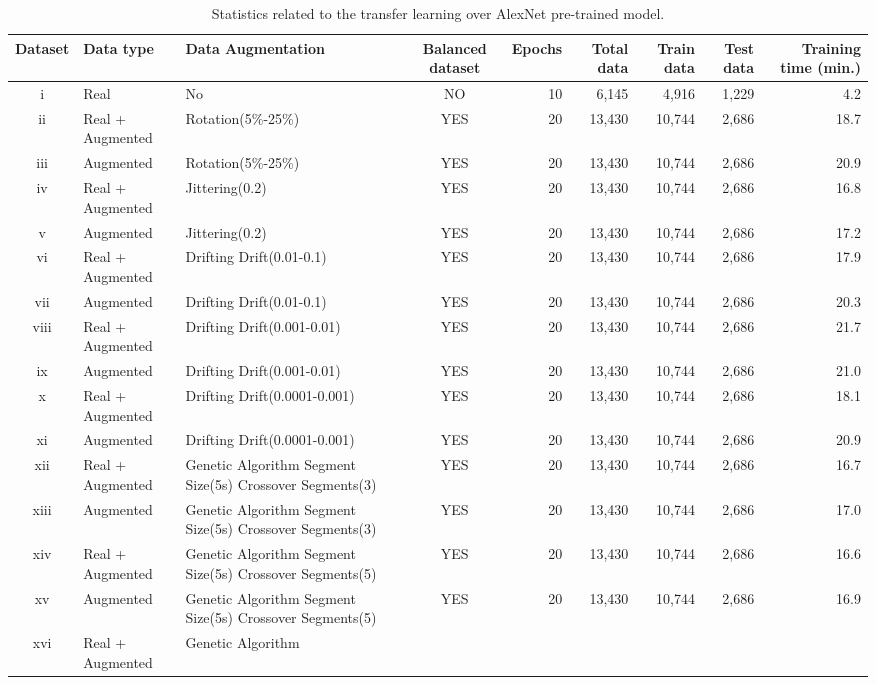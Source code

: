 \documentclass[lettersize,journal]{IEEEtran}
\begin{document}
\begin{table}
\caption{Statistics related to the transfer learning over AlexNet pre-trained model.}
\centering
\begin{adjustbox}{width=\textwidth}
\begin{tabular}{cllcrrrrr}
\hline\hline
Dataset & Data type & Data Augmentation & Balanced dataset & Epochs & Total data & Train data & Test data & Training time (min.) \\
\hline
i & Real & No & NO & 10 & 6,145 & 4,916 & 1,229 & 4.2 \\
ii & Real + Augmented & Rotation(5\%-25\%) & YES & 20 & 13,430 & 10,744 & 2,686 & 18.7 \\
iii & Augmented & Rotation(5\%-25\%) & YES & 20 & 13,430 & 10,744 & 2,686 & 20.9 \\
iv & Real + Augmented & Jittering(0.2) & YES & 20 & 13,430 & 10,744 & 2,686 & 16.8 \\
v & Augmented & Jittering(0.2) & YES & 20 & 13,430 & 10,744 & 2,686 & 17.2 \\
vi & Real + Augmented & Drifting Drift(0.01-0.1) & YES & 20 & 13,430 & 10,744 & 2,686 & 17.9 \\
vii & Augmented & Drifting
  Drift(0.01-0.1) & YES & 20 & 13,430 & 10,744 & 2,686 & 20.3 \\
viii & Real + Augmented & Drifting Drift(0.001-0.01) & YES & 20 & 13,430 & 10,744 & 2,686 & 21.7 \\
ix & Augmented & Drifting
  Drift(0.001-0.01) & YES & 20 & 13,430 & 10,744 & 2,686 & 21.0 \\
x & Real + Augmented & Drifting Drift(0.0001-0.001) & YES & 20 & 13,430 & 10,744 & 2,686 & 18.1 \\
xi & Augmented & Drifting Drift(0.0001-0.001) & YES & 20 & 13,430 & 10,744 & 2,686 & 20.9 \\
xii & Real + Augmented & Genetic Algorithm
  Segment Size(5s) Crossover Segments(3) & YES & 20 & 13,430 & 10,744 & 2,686 & 16.7 \\
xiii & Augmented & Genetic Algorithm Segment Size(5s) Crossover
  Segments(3) & YES & 20 & 13,430 & 10,744 & 2,686 & 17.0 \\
xiv & Real + Augmented & Genetic Algorithm
  Segment Size(5s) Crossover Segments(5) & YES & 20 & 13,430 & 10,744 & 2,686 & 16.6 \\
xv & Augmented & Genetic Algorithm Segment Size(5s) Crossover
  Segments(5) & YES & 20 & 13,430 & 10,744 & 2,686 & 16.9 \\
xvi & Real + Augmented & Genetic Algorithm

\end{tabular}
\end{adjustbox}
\end{table}
\end{document}
